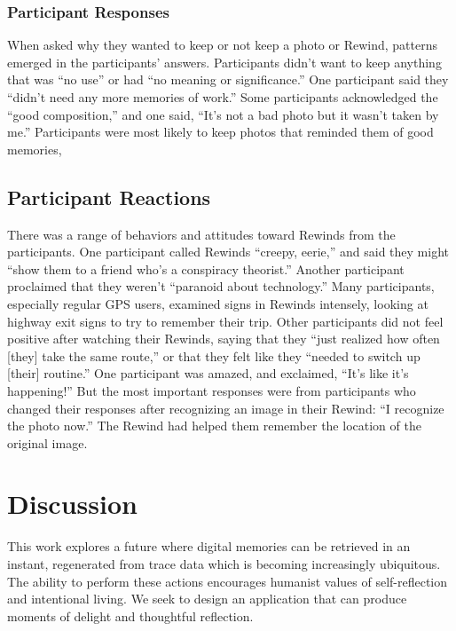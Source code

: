 \documentclass{sigchi}
\begin{document}



\subsubsection{Participant Responses}
When asked why they wanted to keep or not keep a photo or Rewind, patterns emerged in the participants' answers. Participants didn't want to keep anything that was ``no use'' or had ``no meaning or significance.'' One participant said they ``didn't need any more memories of work.'' Some participants acknowledged the ``good composition,'' and one said, ``It's not a bad photo but it wasn't taken by me.'' Participants were most likely to keep photos that reminded them of good memories, 

\subsection{Participant Reactions}
There was a range of behaviors and attitudes toward Rewinds from the participants. One participant called Rewinds ``creepy, eerie,'' and said they might ``show them to a friend who's a conspiracy theorist.'' Another participant proclaimed that they weren't ``paranoid about technology.'' Many participants, especially regular GPS users, examined signs in Rewinds intensely, looking at highway exit signs to try to remember their trip. Other participants did not feel positive after watching their Rewinds, saying that they ``just realized how often [they] take the same route,'' or that they felt like they ``needed to switch up [their] routine.'' One participant was amazed, and exclaimed, ``It's like it's happening!'' But the most important responses were from participants who changed their responses after recognizing an image in their Rewind: ``I recognize the photo now.'' The Rewind had helped them remember the location of the original image.

\section{Discussion}
This work explores a future where digital memories can be retrieved in an instant, regenerated from trace data which is becoming increasingly ubiquitous. The ability to perform these actions encourages humanist values of self-reflection and intentional living. We seek to design an application that can produce moments of delight and thoughtful reflection.
\end{document}
